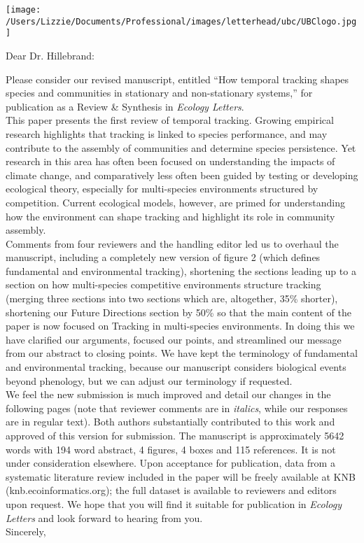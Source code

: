 \documentclass[11pt,a4paper]{letter}
\begin{document}
\begin{letter}{}
\texttt{[image: /Users/Lizzie/Documents/Professional/images/letterhead/ubc/UBClogo.jpg]}\\
\opening{Dear Dr. Hillebrand:}
Please consider our revised manuscript, entitled ``How temporal tracking shapes species and communities in stationary and non-stationary systems,'' for publication as a Review \& Synthesis in \emph{Ecology Letters}. 
\vspace{1.5ex}\\
This paper presents the first review of temporal tracking. Growing empirical research highlights that tracking is linked to species performance, and may contribute to the assembly of communities and determine species persistence. Yet research in this area has often been focused on understanding the impacts of climate change, and comparatively less often been guided by testing or developing ecological theory, especially for multi-species environments structured by competition. Current ecological models, however, are primed for understanding how the environment can shape tracking and highlight its role in community assembly. %
\vspace{1.5ex}\\
Comments from four reviewers and the handling editor led us to overhaul the manuscript, including a completely new version of figure 2 (which defines fundamental and environmental tracking), shortening the sections leading up to a section on how multi-species competitive environments structure tracking (merging three sections into two sections which are, altogether, 35\% shorter), shortening our Future Directions section by 50\% so that the main content of the paper is now focused on Tracking in multi-species environments. In doing this we have clarified our arguments, focused our points, and streamlined our message from our abstract to closing points. We have kept the terminology of fundamental and environmental tracking, because our manuscript considers biological events beyond phenology, but we can adjust our terminology if requested. 
\vspace{1.5ex}\\
We feel the new submission is much improved and detail our changes in the following pages (note that reviewer comments are in \emph{italics}, while our responses are in regular text). Both authors substantially contributed to this work and approved of this version for submission. The manuscript is approximately 5642 words with 194 word abstract, 4 figures,  4 boxes and 115 references. It is not under consideration elsewhere. Upon acceptance for publication, data from a systematic literature review included in the paper will be freely available at KNB (knb.ecoinformatics.org); the full dataset is available to reviewers and editors upon request. We hope that you will find it suitable for publication in \emph{Ecology Letters} and look forward to hearing from you.
\vspace{1.5ex}\\
Sincerely,\\


\end{letter}
\end{document}
